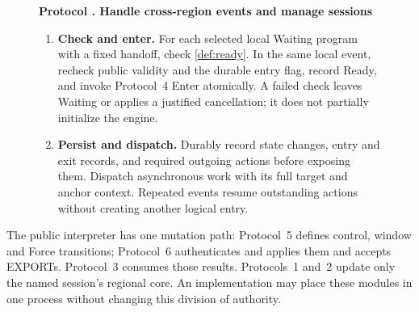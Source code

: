 \documentclass[11pt,a4paper]{article}
\newcounter{protocol}
\newenvironment{protocol}[3][htbp]{\begin{figure}[#1]\refstepcounter{protocol}\label{#2}
\begin{mdframed}[linewidth=.6pt,skipabove=0pt,skipbelow=0pt,
innertopmargin=7pt,innerbottommargin=7pt]\small
\textbf{Protocol \theprotocol. #3}\par\smallskip}{\end{mdframed}\end{figure}}
\begin{document}
\begin{protocol}[H]{alg:rotation}{Handle cross-region events and manage sessions}
\begin{enumerate}[label=\textbf{\arabic*)},itemsep=3pt]
closure relay and idempotent \texttt{RequestClose} of \cref{sec:retirement}.
If the snapshot is not yet known, retain a pending relay obligation.
Any later old-session packet with the necessary context triggers this
control response before ordinary processing. Keep signed routing,
historical evidence and publication duties. Apply terminal receipts
to entered source engines under the existing Completion rule.
\item \textbf{Check and enter.} For each selected local Waiting
program with a fixed handoff, check \cref{def:ready}. In the same local
event, recheck public validity and the durable entry flag, record Ready,
and invoke Protocol~4 Enter atomically. A failed check leaves Waiting
or applies a justified cancellation; it does not partially initialize
the engine.
\item \textbf{Persist and dispatch.} Durably record state changes,
entry and exit records, and required outgoing actions before exposing
them. Dispatch asynchronous work with its full target and anchor
context. Repeated events resume outstanding actions without creating
another logical entry.
\end{enumerate}
\end{protocol}

The public interpreter has one mutation path: Protocol~5 defines
control, window and Force transitions; Protocol~6 authenticates and
applies them and accepts EXPORTs. Protocol~3 consumes those results.
Protocols~1 and~2 update only the named session's regional core.
An implementation may place these modules in one process without
changing this division of authority.
\end{document}
